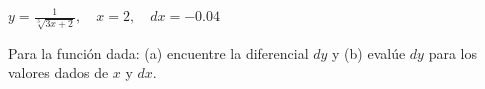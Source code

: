 \item $\displaystyle y = \frac{1}{\sqrt[3]{3x + 2}}, \quad x = 2, \quad dx = -0.04$
\par
Para la función dada: (a) encuentre la diferencial $dy$ y (b) evalúe $dy$ para los valores dados de $x$ y $dx$.
